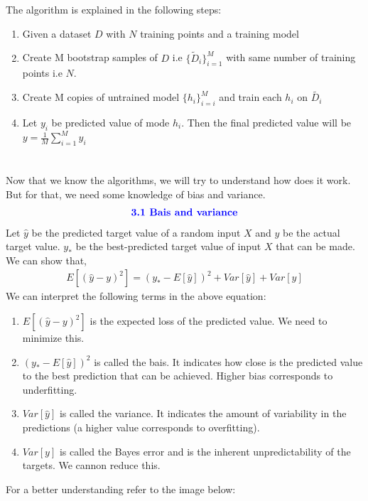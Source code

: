 \documentclass{homework}
\begin{document}
\section{}
The algorithm is explained in the following steps:
\begin{enumerate}
    \item Given a dataset $D$ with $N$ training points and a training model
    \item Create M bootstrap samples of $D$ i.e $\{\tilde{D}_{i}\}_{i=1}^{M}$ with same number of training points i.e $N$.
    \item Create M copies of untrained model $\{h_i\}_{i=i}^{M}$ and train each $h_i$ on $\tilde{D_i}$
    \item Let $y_i$ be predicted value of mode $h_i$. Then the final predicted value will be $y = \frac{1}{M}\sum_{i=1}^{M}y_i$ 
\end{enumerate}



\section{}
Now that we know the algorithms, we will try to understand how does it work. But for that, we need some knowledge of bias and variance.
\begin{align*}
   \textcolor{blue}{ \text{{\textbf{3.1 Bais and variance}}}}
\end{align*}
Let $\hat{y}$ be the predicted target value of a random input $X$ and $y$ be the actual target value. $y_*$ be the best-predicted target value of input $X$ that can be made. We can show that,
\begin{align*}
    E[(\hat{y} - y)^2] = (y_* - E[\hat{y}])^2 + Var[\hat{y}] + Var[y]
\end{align*}
We can interpret the following terms in the above equation:
\begin{enumerate}
    \item $E[(\hat{y} - y)^2]$ is the expected loss of the predicted value. We need to minimize this.
    \item $(y_* - E[\hat{y}])^2$ is called the bais. It indicates how close is the predicted value to the best prediction that can be achieved. Higher bias corresponds to underfitting.
    \item $Var[\hat{y}]$ is called the variance. It indicates the amount of variability in the predictions (a higher value corresponds to overfitting).
    \item $Var[y]$ is called the Bayes error and is the inherent unpredictability of the targets. We cannon reduce this.
\end{enumerate}
For a better understanding refer to the image below:
\end{document}
